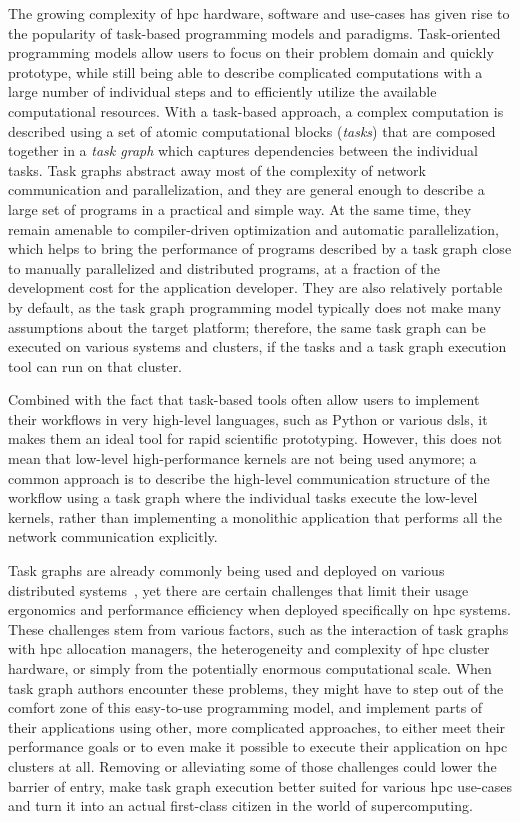 The growing complexity of \gls{hpc} hardware, software and use-cases has given rise to
the popularity of task-based programming models and paradigms. Task-oriented programming models
allow users to focus on their problem domain and quickly prototype, while still being able to
describe complicated computations with a large number of individual steps and to efficiently
utilize the available computational resources. With a task-based approach, a complex computation is
described using a set of atomic computational blocks (\emph{tasks}) that are composed
together in a \emph{task graph} which captures dependencies between the individual tasks. Task
graphs abstract away most of the complexity of network communication and parallelization, and they
are general enough to describe a large set of programs in a practical and simple way. At the same
time, they remain amenable to compiler-driven optimization and automatic parallelization, which
helps to bring the performance of programs described by a task graph close to manually parallelized
and distributed programs, at a fraction of the development cost for the application developer. They
are also relatively portable by default, as the task graph programming model typically does not
make many assumptions about the target platform; therefore, the same task graph can be executed on
various systems and clusters, if the tasks and a task graph execution tool can run on that cluster.

Combined with the fact that task-based tools often allow users to implement their workflows in very
high-level languages, such as Python or various \glspl{dsl}, it makes them an ideal tool
for rapid scientific prototyping. However, this does not mean that low-level high-performance
kernels are not being used anymore; a common approach is to describe the high-level communication
structure of the workflow using a task graph where the individual tasks execute the low-level
kernels, rather than implementing a monolithic application that performs all the network
communication explicitly.

Task graphs are already commonly being used and deployed on various distributed
systems~\cite{pegasus, workflows_at_scale, large_scale_modelling}, yet there are certain challenges that limit their usage ergonomics
and performance efficiency when deployed specifically on \gls{hpc} systems. These
challenges stem from various factors, such as the interaction of task graphs with
\gls{hpc} allocation managers, the heterogeneity and complexity of
\gls{hpc} cluster hardware, or simply from the potentially enormous computational
scale. When task graph authors encounter these problems, they might have to step out of the comfort
zone of this easy-to-use programming model, and implement parts of their applications using other,
more complicated approaches, to either meet their performance goals or to even make it possible to
execute their application on \gls{hpc} clusters at all. Removing or alleviating some
of those challenges could lower the barrier of entry, make task graph execution better suited for
various \gls{hpc} use-cases and turn it into an actual first-class citizen in the
world of supercomputing\@.

